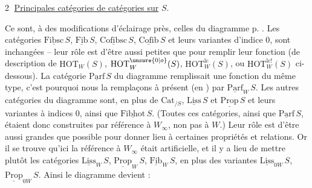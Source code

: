\textcircled{2} \uline{Principales catégories de catégories sur} $S$.

Ce sont, à des modifications d'éclairage près, celles
du diagramme p. . Les catégories $\underline{\mathrm{Fibsc}}\,S$, $\underline{\mathrm{Fib}}\,S$,
$\underline{\mathrm{Cofibsc}}\,S$, $\underline{\mathrm{Cofib}}\,S$ et leurs variantes d'indice $0$,
sont inchangées -- leur rôle est d'être aussi petites
que  pour remplir leur fonction (de description de $\mathrm{HOT}_W(S)$, $\mathrm{HOT}_W^{\unsure{0|o}}(S)$, $\mathrm{HOT}_W^{\mathrm{lc}}(S)$, ou $\mathrm{HOT}_W^{\mathrm{lc}!}(S)$
ci-dessous). La catégorie $\underline{\mathrm{Parf}}\,S$ du diagramme
remplissait une fonction du même type, c'est
pourquoi nous la remplaçons à présent (en ) par $\underline{\mathrm{Parf}}_W\,S$. Les autres catégories du
diagramme sont, en plus de $\mathrm{Cat}_{/S}$, $\underline{\mathrm{Liss}}\,S$ et
$\underline{\mathrm{Prop}}\,S$ et leurs variantes à indices $0$, ainsi que
$\underline{\mathrm{Fibhot}}\,S$. (Toutes ces catégories, ainsi que $\underline{\mathrm{Parf}}\,S$, étaient
donc construites par référence à $W_\infty$, non pas
à $W$.) Leur rôle  est d'être aussi grandes
que possible pour donner lieu à certaines
propriétés et relations. Or il se trouve qu'ici la
référence à $W_\infty$ était artificielle, et il y a
lieu de mettre plutôt les catégories
$\underline{\mathrm{Liss}}_W\,S$, $\underline{\mathrm{Prop}}_W\,S$, $\underline{\mathrm{Fib}}_W\,S$,  en plus des variantes
$\underline{\mathrm{Liss}}_{0W}\,S$, $\underline{\mathrm{Prop}}_{0W}\,S$. Ainsi le diagramme devient :

